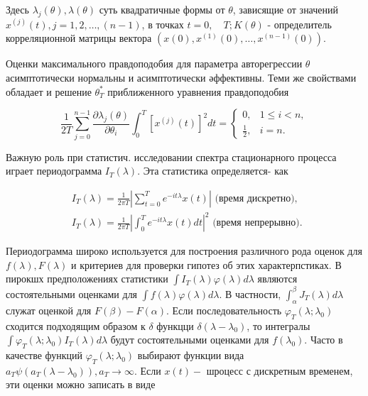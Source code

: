 \documentclass[10pt]{article}
\begin{document}
Здесь $\lambda_{j}(\theta), \lambda(\theta)$ суть квадратичные формы от $\theta$, зависящие от значений $x^{(j)}(t), j=1,2, \ldots,(n-1)$, в точках $t=0, \quad T ; K(\theta)$ - определитель корреляционной матрицы вектора $\left(x(0), x^{(1)}(0), \ldots, x^{(n-1)}(0)\right)$.



Оценки максимального правдоподобия для параметра авторегрессии $\theta$ асимптотически нормальны и асимптотически әффективны. Теми же свойствами обладает и решение $\theta_{T}^{*}$ приближенного уравнения правдоподобия



\[

\frac{1}{2 T} \sum_{j=0}^{n-1} \frac{\partial \lambda_{j}(\theta)}{\partial \theta_{i}} \int_{0}^{T}\left[x^{(j)}(t)\right]^{2} d t= \begin{cases}0, & 1 \leqslant i<n, \\ \frac{1}{2}, & i=n .\end{cases}

\]



Важную роль при статистич. исследовании спектра стационарного процесса играет периодограмма $I_{T}(\lambda)$. Эта статистика определяется- как



\[

\begin{aligned}

& I_{T}(\lambda)=\frac{1}{2 \pi T}\left|\sum_{t=0}^{T} e^{-i t \lambda} x(t)\right| \text { (время дискретно), } \\

& I_{T}(\lambda)=\frac{1}{2 \pi T}\left|\int_{0}^{T} e^{-i t \lambda} x(t) d t\right|^{2} \text { (время непрерывно). }

\end{aligned}

\]



Периодограмма широко используется для построения различного рода оценок для $f(\lambda), F(\lambda)$ и критериев для проверки гипотез об этих характерпстиках. В пирокшх предположениях статистики $\int I_{T}(\lambda) \varphi(\lambda) d \lambda$ являются состоятельными оценками для $\int f(\lambda) \varphi(\lambda) d \lambda$. В частности, $\int_{\alpha}^{\beta} J_{T}(\lambda) d \lambda$ служат оценкой для $F(\beta)-F(\alpha)$. Если последовательность $\varphi_{T}\left(\lambda ; \lambda_{0}\right)$ сходится подходящим образом к $\delta$ функцци $\delta\left(\lambda-\lambda_{0}\right)$, то интегралы $\int \varphi_{T}\left(\lambda ; \lambda_{0}\right) I_{T}(\lambda) d \lambda$ будут состоятельными оценками для $f\left(\lambda_{0}\right)$. Часто в качестве функций $\varphi_{T}\left(\lambda ; \lambda_{0}\right)$ выбирают функции вида $a_{T} \psi\left(a_{T}\left(\lambda-\lambda_{0}\right)\right), a_{T} \rightarrow \infty$. Если $x(t)-$ шроцесс с дискретным временем, эти оценки можно записать в виде
\end{document}
